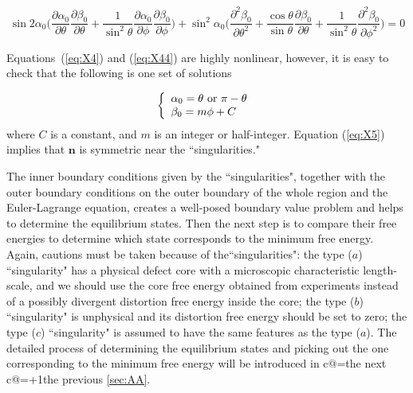 \documentclass[nottitlepage]{article}
\makeatletter
\providecommand\hyperref[2][]{#2}
\newcommand{\mt@ref}[1]{%
\cref@gettype{#1}{\@temptype}%
\cref@getcounter{#1}{\@tempctr}%
\def\mtt{\the\csname c@\@temptype\endcsname}%
\ifnum\mtt=\numexpr\@tempctr-1\relax \mtcase the next \hyperref[#1]{\@temptype}\else%
\ifnum\mtt=\numexpr\@tempctr+1\relax \mtcase the previous \hyperref[#1]{\@temptype}\else%
\cref{#1}\fi\fi}
\newcommand{\mtref}{\let\mtcase\relax\mt@ref}
\makeatother
\begin{document}
 \begin{equation}\label{eq:X44}
\sin 2\alpha_0\Big(\frac{\partial \alpha_0}{\partial \theta}\frac{\partial \beta_0}{\partial \theta}+\frac{1}{\sin^2\theta}\frac{\partial \alpha_0}{\partial \phi}\frac{\partial \beta_0}{\partial \phi}\Big)+\sin^2\alpha_0\Big(\frac{\partial^2 \beta_0}{\partial \theta^2}+\frac{\cos\theta}{\sin\theta}\frac{\partial \beta_0}{\partial \theta}+\frac{1}{\sin^2\theta}\frac{\partial^2 \beta_0}{\partial \phi^2}\Big)=0
  \end{equation}

  Equations~(\ref{eq:X4}) and (\ref{eq:X44}) are highly nonlinear, however, it is easy to check that the following is one set of solutions
  
  \begin{equation}\label{eq:X5}
             \left\{
             \begin{array}{l l l}
  
             \alpha_0=\theta \text{ or } \pi-\theta\\
             \beta_0=m\phi+C\\
             \end{array}
             \right.\
             \end{equation}
where $C$ is a constant, and $m$ is an integer or half-integer. Equation (\ref{eq:X5}) implies that $\mathbf{n}$ is symmetric near the ``singularities." %

 


The inner boundary conditions given by the ``singularities", together with the outer boundary conditions on the outer boundary of the whole region and the Euler-Lagrange equation, creates a well-posed boundary value problem and helps to determine the equilibrium states. Then the next step is to compare their free energies to determine which state corresponds to the minimum free energy. Again, cautions must be taken because of the``singularities": the type ($a$) ``singularity" has a physical defect core with a microscopic characteristic length-scale, and we should use the core free energy obtained from experiments instead of a possibly divergent distortion free energy inside the core; the type ($b$) ``singularity" is unphysical and its distortion free energy should be set to zero; the type ($c$) ``singularity" is assumed to have the same features as the type ($a$). The detailed process of determining the equilibrium states and picking out the one corresponding to the minimum free energy will be introduced in \mtref{sec:AA}.
\end{document}

